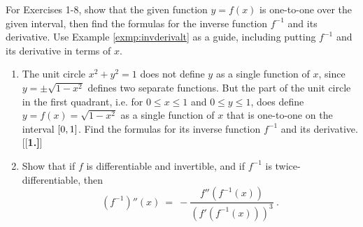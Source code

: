 \divider
\vspace{3mm}
\startexercises\label{sec2dot1}
{\small
{}
\par\noindent For Exercises 1-8, show that the given function $y = f(x)$ is
 one-to-one over the given interval, then find the formulas for the inverse
 function $f^{-1}$ and its derivative. Use Example \ref{exmp:invderivalt} as a
 guide, including putting $f^{-1}$ and its derivative in terms of $x$.
\begin{enumerate}[\bfseries 1.]
 \item The unit circle $x^2 + y^2 = 1$ does not define $y$ as a single function
  of $x$, since $y = \pm \sqrt{1 - x^2}$ defines two separate functions. But
  the part of the unit circle in the first quadrant, i.e. for $0 \le x \le 1$
  and $0 \le y \le 1$, does define $y = f(x) = \sqrt{1 - x^2}$ as a single
  function of $x$ that is one-to-one on the interval $\lbrack 0,1 \rbrack$. Find the
  formulas for its inverse function $f^{-1}$ and its derivative.
[{[\bfseries 1.]}]
 \item Show that if $f$ is differentiable and invertible, and if $f^{-1}$ is
  twice-differentiable, then
  \begin{displaymath}
   \left(f^{-1}\right)''(x) ~=~ -\frac{f''(f^{-1}(x))}{\left(f'(f^{-1}(x))\right)^3} ~.
  \end{displaymath}
\end{enumerate}}
\newpage
